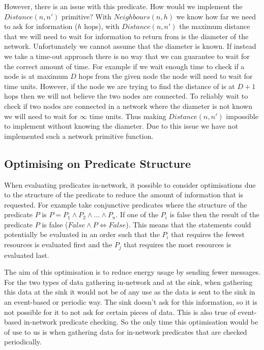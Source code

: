 However, there is an issue with this predicate. How would we implement the $Distance(n, n')$ primitive? With $Neighbours(n, h)$ we know how far we need to ask for information ($h$ hops), with $Distance(n, n')$ the maximum distance that we will need to wait for information to return from is the diameter of the network. Unfortunately we cannot assume that the diameter is known. If instead we take a time-out approach there is no way that we can guarantee to wait for the correct amount of time. For example if we wait enough time to check if a node is at maximum $D$ hops from the given node the node will need to wait for  time units. However, if the node we are trying to find the distance of is at $D + 1 $ hops then we will not believe the two nodes are connected. To reliably wait to check if two nodes are connected in a network where the diameter is not known we will need to wait for $\infty$ time units. Thus making $Distance(n, n')$ impossible to implement without knowing the diameter. Due to this issue we have not implemented such a network primitive function.


\subsection{Optimising on Predicate Structure}



When evaluating predicates in-network, it possible to consider optimisations due to the structure of the predicate to reduce the amount of information that is requested. For example take conjunctive predicates where the structure of the predicate $P$ is $P = P_1 \land P_2 \land \ldots \land P_n$. If one of the $P_i$ is false then the result of the predicate $P$ is false ($False \land P \Leftrightarrow False$). This means that the statements could potentially be evaluated in an order such that the $P_i$ that requires the fewest resources is evaluated first and the $P_j$ that requires the most resources is evaluated last.

The aim of this optimisation is to reduce energy usage by sending fewer messages. For the two types of data gathering in-network and at the sink, when gathering this data at the sink it would not be of any use as the data is sent to the sink in an event-based or periodic way. The sink doesn't ask for this information, so it is not possible for it to not ask for certain pieces of data. This is also true of event-based in-network predicate checking. So the only time this optimisation would be of use to us is when gathering data for in-network predicates that are checked periodically.

